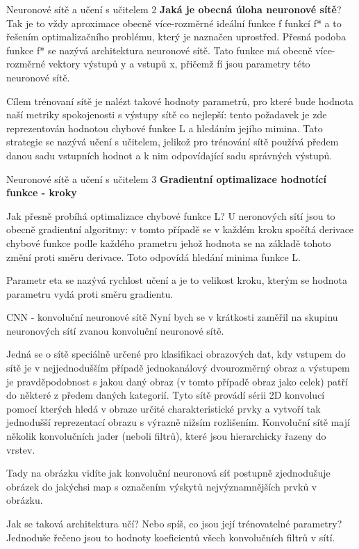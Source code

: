 \documentclass[aspectratio=1610]{beamer}
\begin{document}
\begin{frame}{Neuronové sítě a učení s učitelem 2}
\textbf{Jaká je obecná úloha neuronové sítě}? Tak je to vždy aproximace obecně více-rozměrné ideální funkce f funkcí f* a to řešením optimalizačního problému, který je naznačen uprostřed. Přesná podoba funkce f* se nazývá architektura neuronové sítě. Tato funkce má obecně více-rozměrné vektory výstupů y a vstupů x, přičemž fí jsou parametry této neuronové sítě.

Cílem trénovaní sítě je nalézt takové hodnoty parametrů, pro které bude hodnota naší metriky spokojenosti s výstupy sítě co nejlepší: tento požadavek je zde reprezentován hodnotou chybové funkce L a hledáním jejího mimina. Tato strategie se nazývá učení s učitelem, jelikož pro trénování sítě používá předem danou sadu vstupních hodnot a k nim odpovídající sadu správných výstupů.
\end{frame}
\begin{frame}{Neuronové sítě a učení s učitelem 3}
\textbf{Gradientní optimalizace hodnotící funkce - kroky}

Jak přesně probíhá optimalizace chybové funkce L? U neronových sítí jsou to obecně gradientní algoritmy: v tomto případě se v každém kroku spočítá derivace chybové funkce podle každého prametru jehož hodnota se na základě tohoto změní proti směru derivace. Toto odpovídá hledání minima funkce L. 

Parametr eta se nazývá rychlost učení a je to velikost kroku, kterým se hodnota parametru vydá proti směru gradientu.
\end{frame}
\begin{frame}{CNN - konvoluční neuronové sítě}
Nyní bych se v krátkosti zaměřil na skupinu neuronových sítí zvanou konvoluční neuronové sítě. 

Jedná se o sítě speciálně určené pro klasifikaci obrazových dat, kdy vstupem do sítě je v nejjednodušším případě jednokanálový dvourozměrný obraz a výstupem je pravděpodobnost s jakou daný obraz (v tomto případě obraz jako celek) patří do některé z předem daných kategorií. Tyto sítě provádí sérii 2D konvolucí pomocí kterých hledá v obraze určité charakteristické prvky a vytvoří tak jednodušší reprezentací obrazu s výrazně nižsím rozlišením. Konvoluční sítě mají několik konvolučních jader (neboli filtrů), které jsou hierarchicky řazeny do vrstev. 

Tady na obrázku vidíte jak konvoluční neuronová síť postupně zjednodušuje obrázek do jakýchsi map s označením výskytů nejvýznamnějších prvků v obrázku.

Jak se taková architektura učí? Nebo spíš, co jsou její trénovatelné parametry? Jednoduše řečeno jsou to hodnoty koeficientů všech konvolučních filtrů v sítí.
\end{frame}
\end{document}
